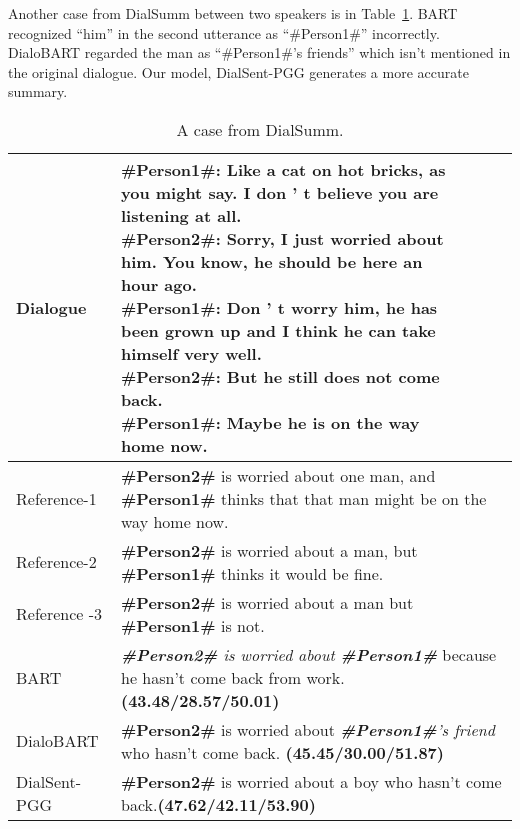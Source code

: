Another case from DialSumm between two speakers is in Table~\ref{tab:case3}. BART recognized ``him'' in the second utterance as ``\#Person1\#'' incorrectly. DialoBART regarded the man as ``\#Person1\#'s friends'' which isn't mentioned in the original dialogue.  Our model, DialSent-PGG generates a more accurate summary.

\begin{table}[th!]
	\small
	\centering
	\begin{tabular}{lp{5cm}}
	\toprule[1pt]
	{Dialogue} & \makecell[l]{\textbf{\#Person1\#}: Like a cat on hot bricks, as \\you might say. I don ' t believe you are\\ listening at all.\\ \textbf{\#Person2\#}: Sorry, I just worried about\\ him. You know, he should be here an \\hour ago. \\ \textbf{\#Person1\#}: Don ' t worry him, he has \\been grown up and I think he can take\\ himself very well. \\ \textbf{\#Person2\#}: But he still does not come\\ back. \\ \textbf{\#Person1\#}: Maybe he is on the way\\ home now.
	} \\
	
	\hline
	{Reference-1} & \textbf{\#Person2\#} is worried about one man, and \textbf{\#Person1\#} thinks that that man might be on the way home now. \\
	\hline
	{Reference-2} & \textbf{\#Person2\#} is worried about a man, but \textbf{\#Person1\#} thinks it would be fine.\\
	\hline
	{Reference -3} &\textbf{\#Person2\#} is worried about a man but \textbf{\#Person1\#} is not.\\
	\hline
	{BART} & \textit{ \textbf{\#Person2\#} is worried about \textbf{\#Person1\#} }because he hasn't come back from work. \textbf{(43.48/28.57/50.01)} \\
	\hline
	{DialoBART} &  \textbf{\#Person2\#} is worried about \textit{\textbf{\#Person1\#}'s friend }who hasn't come back. \textbf{(45.45/30.00/51.87)} \\
	\hline
	{DialSent-PGG} & \textbf{\#Person2\#} is worried about a boy who hasn't come back.\textbf{(47.62/42.11/53.90)}\\
	\bottomrule[1pt]
	\end{tabular}
	\caption{A case from DialSumm.}
\label{tab:case3}
\end{table}






